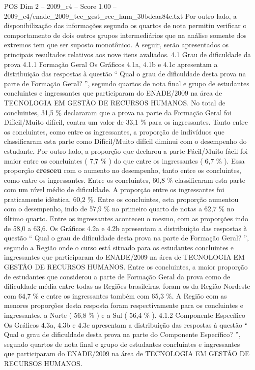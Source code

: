 \begin{textsample}{POS Dim 2 – 2009\_c4 – Score 1.00 – 2009\_c4/enade\_2009\_tec\_gest\_rec\_hum\_30bdeaa84c.txt}
Por outro lado, a disponibilização das informações segundo os quartos de nota permitiu verificar o comportamento de dois outros grupos intermediários que na análise somente dos extremos tem que ser suposto monotônico.
A seguir, serão apresentados os principais resultados relativos aos nove itens avaliados. 4.1 Grau de dificuldade da prova 4.1.1 Formação Geral Os Gráficos 4.1a, 4.1b e 4.1c apresentam a distribuição das respostas à questão “ Qual o grau de dificuldade desta prova na parte de Formação Geral? ”, segundo quartos de nota final e grupo de estudantes concluintes e ingressantes que participaram do ENADE/2009 na área de TECNOLOGIA EM GESTÃO DE RECURSOS HUMANOS.
No total de concluintes, 31,5 \% declararam que a prova na parte da Formação Geral foi Difícil/Muito difícil, contra um valor de 33,1 \% para os ingressantes.
Tanto entre os concluintes, como entre os ingressantes, a proporção de indivíduos que classificaram esta parte como Difícil/Muito difícil diminui com o desempenho do estudante.
Por outro lado, a proporção que declarou a parte Fácil/Muito fácil foi maior entre os concluintes ( 7,7 \% ) do que entre os ingressantes ( 6,7 \% ).
Essa proporção \textbf{cresceu} com o aumento no desempenho, tanto entre os concluintes, como entre os ingressantes.
Entre os concluintes, 60,8 \% classificaram esta parte com um nível médio de dificuldade.
A proporção entre os ingressantes foi praticamente idêntica, 60,2 \%.
Entre os concluintes, esta proporção aumentou com o desempenho, indo de 57,9 \% no primeiro quarto de notas a 62,7 \% no último quarto.
Entre os ingressantes aconteceu o mesmo, com as proporções indo de 58,0 a 63,6.
Os Gráficos 4.2a e 4.2b apresentam a distribuição das respostas à questão “ Qual o grau de dificuldade desta prova na parte de Formação Geral? ”, segundo a Região onde o curso está situado para os estudantes concluintes e ingressantes que participaram do ENADE/2009 na área de TECNOLOGIA EM GESTÃO DE RECURSOS HUMANOS.
Entre os concluintes, a maior proporção de estudantes que considerou a parte de Formação Geral da prova como de dificuldade média entre todas as Regiões brasileiras, foram os da Região Nordeste com 64,7 \% e entre os ingressantes também com 65,3 \%.
A Região com as menores proporções desta resposta foram respectivamente para os concluintes e ingressantes, a Norte ( 56,8 \% ) e a Sul ( 56,4 \% ). 4.1.2 Componente Específico Os Gráficos 4.3a, 4.3b e 4.3c apresentam a distribuição das respostas à questão “ Qual o grau de dificuldade desta prova na parte do Componente Específico? ”, segundo quartos de nota final e grupo de estudantes concluintes e ingressantes que participaram do ENADE/2009 na área de TECNOLOGIA EM GESTÃO DE RECURSOS HUMANOS.

\end{textsample}
